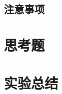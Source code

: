 \documentclass[a4paper]{article}
\begin{document}
    \subsection{注意事项}\label{subsec:20}


    \section{思考题}\label{sec:8}


    \section{实验总结}\label{sec:9}

    
    
\end{document}
